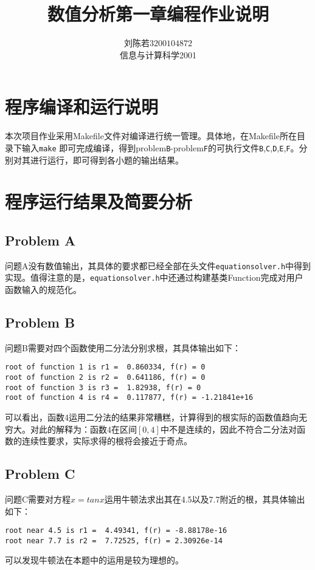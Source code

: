 \documentclass{ctexart}
\begin{document}
\begin{sloppypar}
\title{\vspace{-3cm} \textbf{数值分析第一章编程作业说明}}
\author{刘陈若\;$3200104872$\\信息与计算科学2001}
\date{}

\maketitle

\section*{程序编译和运行说明}
本次项目作业采用Makefile文件对编译进行统一管理。具体地，在Makefile所在目录下输入\verb|make|
即可完成编译，得到problem\verb|B|-problem\verb|F|的可执行文件\verb|B|,\verb|C|,\verb|D|,\verb|E|,\verb|F|。分别对其进行运行，即可得到各小题的输出结果。

\section*{程序运行结果及简要分析}
\subsection*{Problem A}
问题A没有数值输出，其具体的要求都已经全部在头文件\verb|equationsolver.h|中得到实现。值得注意的是，\verb|equationsolver.h|中还通过构建基类Function完成对用户函数输入的规范化。

\subsection*{Problem B}
问题B需要对四个函数使用二分法分别求根，其具体输出如下：
\begin{shaded}
\begin{verbatim}
root of function 1 is r1 =  0.860334, f(r) = 0
root of function 2 is r2 =  0.641186, f(r) = 0
root of function 3 is r3 =  1.82938, f(r) = 0
root of function 4 is r4 =  0.117877, f(r) = -1.21841e+16
\end{verbatim}
\end{shaded}

可以看出，函数4运用二分法的结果非常糟糕，计算得到的根实际的函数值趋向无穷大。对此的解释为：函数4在区间$[0,4]$中不是连续的，因此不符合二分法对函数的连续性要求，实际求得的根将会接近于奇点。

\subsection*{Problem C}
问题C需要对方程$x = tanx$运用牛顿法求出其在4.5以及7.7附近的根，其具体输出如下：
\begin{shaded}
\begin{verbatim}
root near 4.5 is r1 =  4.49341, f(r) = -8.88178e-16
root near 7.7 is r2 =  7.72525, f(r) = 2.30926e-14
\end{verbatim}
\end{shaded}
可以发现牛顿法在本题中的运用是较为理想的。


\end{sloppypar}
\end{document}
